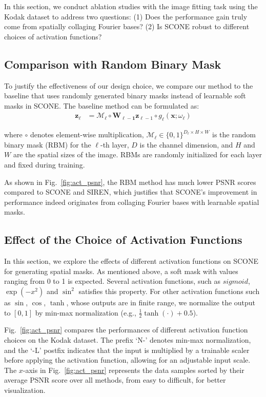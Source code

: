 \documentclass[letterpaper]{article} %
\begin{document}
In this section, we conduct ablation studies with the image fitting task using the Kodak dataset to address two questions: (1) Does the performance gain truly come from spatially collaging Fourier bases? (2) Is SCONE robust to different choices of activation functions?

\subsection{Comparison with Random Binary Mask}
 To justify the effectiveness of our design choice, we compare our method to the baseline that uses randomly generated binary masks instead of learnable soft masks in SCONE. The baseline method can be formulated as:
\vspace{-5pt}
\begin{align*}
         \mathbf{z}_{\ell} &=  \mathcal{M}_{\ell} \circ \mathbf{W_{\ell-1}}\mathbf{z}_{\ell-1} \circ g_{\ell}(\mathbf{x};\omega_{\ell}) 
\end{align*}
\vspace{-14pt}

\noindent where $\circ$ denotes element-wise multiplication, $\mathcal{M_{\ell}}\in \{0, 1\}^{D_{\ell}\times H\times W}$ is the random binary mask (RBM) for the $\ell$-th layer, $D$ is the channel dimension, and $H$ and $W$ are the spatial sizes of the image. RBMs are randomly initialized for each layer and fixed during training.

As shown in Fig.~\ref{fig:act_psnr}, the RBM method has much lower PSNR scores compared to SCONE and SIREN, which justifies that SCONE's improvement in performance indeed originates from collaging Fourier bases with learnable spatial masks. 


\subsection{Effect of the Choice of Activation Functions}
\label{subsec:activation_ablation}
In this section, we explore the effects of different activation functions on SCONE for generating spatial masks. As mentioned above, a soft mask with values ranging from 0 to 1 is expected. Several activation functions, such as $\textit{sigmoid}$, $\exp(-x^2)$ and $\sin^2$ satisfies this property. For other activation functions such as $\sin$, $\cos$, $\tanh$, whose outputs are in finite range, we normalize the output to $[0, 1]$ by min-max normalization (e.g., $\frac{1}{2}\tanh(\cdot)+0.5$).

Fig.~\ref{fig:act_psnr} compares the performances of different activation function choices on the Kodak dataset. The prefix `N-' denotes min-max normalization, and the `-L' postfix indicates that the input is multiplied by a trainable scaler before applying the activation function, allowing for an adjustable input scale. The $x$-axis in Fig.~\ref{fig:act_psnr} represents the data samples sorted by their average PSNR score over all methods, from easy to difficult, for better visualization. 
\end{document}
